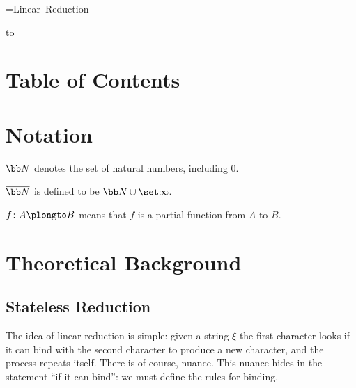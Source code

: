 




{=\hbox{Linear Reduction}
\centerline{
    \vbox{
        \smallskip
    }
}}

\bigskip
\hbox to

\section*{Table of Contents}

\tableofcontents

\vfill\break

\setcounter{section}{-1}
\section{Notation}

\noindent ${\bb N}$ denotes the set of natural numbers, including $0$.

\smallskip
\noindent $\overline{\bb N}$ is defined to be ${\bb N}\cup\set\infty$.

\smallskip
\noindent $f\colon A\plongto B$ means that $f$ is a partial function from $A$ to $B$.

\vfill\break

\section{Theoretical Background}

\subsection{Stateless Reduction}

The idea of linear reduction is simple: given a string $\xi$ the first character looks if it can bind with the second character to produce a new character, and the process repeats itself.
There is of course, nuance.
This nuance hides in the statement ``if it can bind'': we must define the rules for binding.

